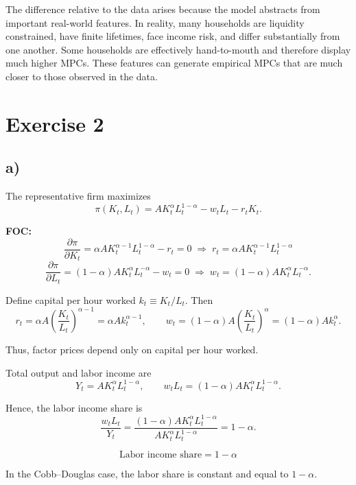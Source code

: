 \documentclass[12pt]{article}
\begin{document}
The difference relative to the data arises because the model abstracts from important real-world features. In reality, many households are liquidity constrained, have finite lifetimes, face income risk, and differ substantially from one another. Some households are effectively hand-to-mouth and therefore display much higher MPCs. These features can generate empirical MPCs that are much closer to those observed in the data.



\section{Exercise 2}

\subsection{a)}

The representative firm maximizes
\[
\pi(K_t,L_t)=A K_t^{\alpha} L_t^{1-\alpha} - w_t L_t - r_t K_t .
\]

\textbf{FOC:}
\[
\frac{\partial \pi}{\partial K_t}
= \alpha A K_t^{\alpha-1} L_t^{1-\alpha} - r_t = 0
\;\Rightarrow\;
r_t = \alpha A K_t^{\alpha-1} L_t^{1-\alpha}
\]
\[
\frac{\partial \pi}{\partial L_t}
= (1-\alpha) A K_t^{\alpha} L_t^{-\alpha} - w_t = 0
\;\Rightarrow\;
w_t = (1-\alpha) A K_t^{\alpha} L_t^{-\alpha}.
\]

Define capital per hour worked $k_t \equiv K_t/L_t$. Then
\[
r_t = \alpha A \left(\frac{K_t}{L_t}\right)^{\alpha-1}
= \alpha A k_t^{\alpha-1},
\qquad
w_t = (1-\alpha) A \left(\frac{K_t}{L_t}\right)^{\alpha}
= (1-\alpha) A k_t^{\alpha}.
\]

Thus, factor prices depend only on capital per hour worked.

Total output and labor income are
\[
Y_t = A K_t^{\alpha} L_t^{1-\alpha},
\qquad
w_t L_t = (1-\alpha) A K_t^{\alpha} L_t^{1-\alpha}.
\]

Hence, the labor income share is
\[
\frac{w_t L_t}{Y_t}
=
\frac{(1-\alpha) A K_t^{\alpha} L_t^{1-\alpha}}
{A K_t^{\alpha} L_t^{1-\alpha}}
= 1-\alpha.
\]

\[
\boxed{\text{Labor income share} = 1-\alpha}
\]

In the Cobb--Douglas case, the labor share is constant and equal to $1-\alpha$.
\end{document}
